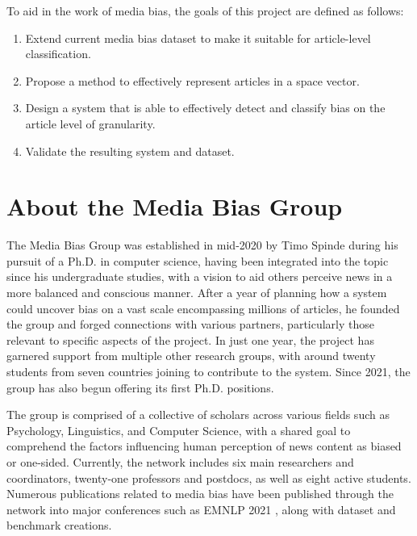 To aid in the work of media bias, the goals of this project are defined as follows:
\begin{enumerate}
    \item Extend current media bias dataset to make it suitable for article-level classification.
    \item Propose a method to effectively represent articles in a space vector.
    \item Design a system that is able to effectively detect and classify bias on the article level of granularity.
    \item Validate the resulting system and dataset.
\end{enumerate}

\section{About the Media Bias Group}

The Media Bias Group \cite{media-bias-group} was established in mid-2020 by Timo Spinde during his pursuit of a Ph.D. in computer science, having been integrated into the topic since his undergraduate studies, with a vision to aid others perceive news in a more balanced and conscious manner. After a year of planning how a system could uncover bias on a vast scale encompassing millions of articles, he founded the group and forged connections with various partners, particularly those relevant to specific aspects of the project. In just one year, the project has garnered support from multiple other research groups, with around twenty students from seven countries joining to contribute to the system. Since 2021, the group has also begun offering its first Ph.D. positions.

The group is comprised of a collective of scholars across various fields such as Psychology, Linguistics, and Computer Science, with a shared goal to comprehend the factors influencing human perception of news content as biased or one-sided. Currently, the network includes six main researchers and coordinators, twenty-one professors and postdocs, as well as eight active students. Numerous publications related to media bias have been published through the network into major conferences such as EMNLP 2021 \cite{spinde-2021-babe}, along with dataset and benchmark creations.


